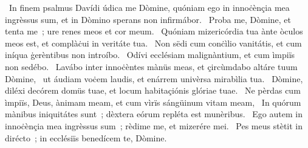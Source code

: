 {~In finem psalmus Davídi}
{%
údica me Dòmine, quóniam ego in innoċènçia mea ingrèssus sum, et in Dòmino sperans non infirmábor.
~Proba me, Dòmine, et tenta me~; ure renes meos et cor meum.
~Quóniam mizericórdia tua ànte òculos meos est, et complàċui in veritáte tua.
~Non sëdi cum conċìlio vanitátis, et cum iníqua ġerèntibus non introíbo.
~Odívi ecclésiam malignàntium, et cum ìmpiïs non sedébo.
~Lavábo inter innoċèntes mànüs meas, et çircùmdabo altáre tuum Dòmine,
~ut áudiam voċem laudis, et enárrem univèrsa mirabìlia tua.
~Dòmine, diléxi decórem domüs tuae, et locum habitaçiónis glóriae tuae.
~Ne pèrdas cum ìmpiïs, Deus, ànimam meam, et cum vìrïs sángüinum vitam meam,
~In quórum mànibus iniquitátes sunt~; dèxtera eórum repléta est munèribus.
~Ego autem in innoċènçia mea ingrèssus sum~; rèdime me, et mizerére mei.
~Pes meus stètit in dirécto~; in ecclésiïs benedícem te, Dòmine.
}
